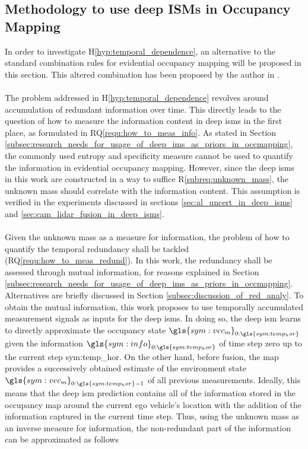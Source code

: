 \subsection{Methodology to use deep ISMs in Occupancy Mapping}
\label{subsec:method_to_use_deep_isms_in_occmaps}
In order to investigate H\ref{hyp:temporal_dependence}, an alternative to the standard combination rules for evidential occupancy mapping will be proposed in this section. This altered combination has been proposed by the author in \cite{bauer2020deep}.
\\\\
The problem addressed in H\ref{hyp:temporal_dependence} revolves around accumulation of redundant information over time. This directly leads to the question of how to measure the information content in deep \gls{ism}s in the first place, as formulated in RQ\ref{requ:how_to_meas_info}. As stated in Section \ref{subsec:research_needs_for_usage_of_deep_ims_as_priors_in_occmapping}, the commonly used entropy and specificity measure cannot be used to quantify the information in evidential occupancy mapping. However, since the deep \gls{ism}s in this work are constructed in a way to suffice R\ref{subreq:unknown_mass}, the unknown mass should correlate with the information content. This assumption is verified in the experiments discussed in sections \ref{sec:al_uncert_in_deep_isms} and \ref{sec:cam_lidar_fusion_in_deep_isms}.
\\\\
Given the unknown mass as a measure for information, the problem of how to quantify the temporal redundancy shall be tackled (RQ\ref{requ:how_to_meas_redund}). In this work, the redundancy shall be assessed through mutual information, for reasons explained in Section \ref{subsec:research_needs_for_usage_of_deep_ims_as_priors_in_occmapping}. Alternatives are briefly discussed in Section \ref{subsec:discussion_of_red_analy}. To obtain the mutual information, this work proposes to use temporally accumulated measurement signals as inputs for the deep \gls{ism}s. In doing so, the deep \gls{ism} learns to directly approximate the occupancy state $\gls{sym:vec_m}_{0:\gls{sym:temp_hor}}$ given the information $\gls{sym:info}_{0:\gls{sym:temp_hor}}$ of time step zero up to the current step \gls{sym:temp_hor}. On the other hand, before fusion, the map provides a successively obtained estimate of the environment state $\gls{sym:vec_m}_{0:\gls{sym:temp_hor}-1}$ of all previous measurements. Ideally, this means that the deep \gls{ism} prediction contains all of the information stored in the occupancy map around the current ego vehicle's location with the addition of the information captured in the current time step. Thus, using the unknown mass as an inverse measure for information, the non-redundant part of the information can be approximated as follows
